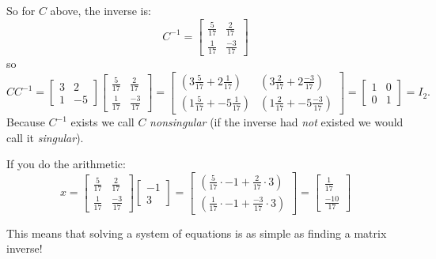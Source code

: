 So for $C$ above, the inverse is: 
\[
C^{-1} = \left[\begin{matrix}\frac{5}{17}& \frac{2}{17}\\\frac{1}{17} & \frac{-3}{17}\end{matrix}\right]
\]
so 
\[
CC^{-1} = \left[\begin{matrix} 3 & 2 \\ 1 & -5\end{matrix}\right]
\left[\begin{matrix}\frac{5}{17}& \frac{2}{17}\\\frac{1}{17} & \frac{-3}{17}\end{matrix}\right] = 
\left[\begin{matrix} (3\frac{5}{17} + 2\frac{1}{17}) & (3\frac{2}{17} + 2\frac{-3}{17})  \\ (1\frac{5}{17} + -5\frac{1}{17}) & (1\frac{2}{17} + -5\frac{-3}{17}) \end{matrix}\right]=
\left[\begin{matrix} 1 & 0 \\ 0 & 1\end{matrix}\right] = I_2.
\]
Because $C^{-1}$ exists we call $C$ \emph{nonsingular} 
(if the inverse had \textit{not} existed we would call it \emph{singular}). 

If you do the arithmetic: 
\[x = 
\left[\begin{matrix}\frac{5}{17}& \frac{2}{17}\\\frac{1}{17} & \frac{-3}{17}\end{matrix}\right]
\left[\begin{matrix} -1 \\ 3\end{matrix}\right]=
\left[\begin{matrix} \left(\frac{5}{17}\cdot-1 + \frac{2}{17}\cdot3\right) \\ \left(\frac{1}{17}\cdot-1+ \frac{-3}{17}\cdot3\right)\end{matrix}\right]=
\left[\begin{matrix} \frac{1}{17}\\ \frac{-10}{17}\end{matrix}\right]
\]

This means that solving a system of equations is as simple as finding a matrix inverse! 



